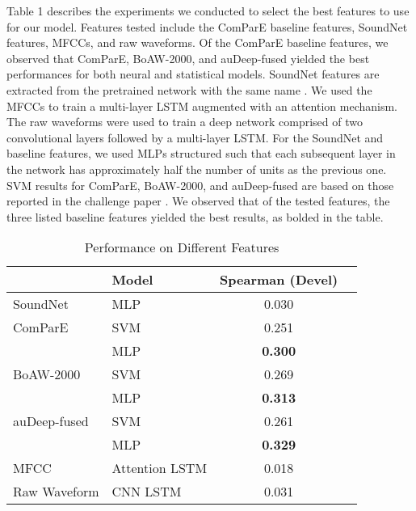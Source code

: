 Table 1 describes the experiments we conducted to select the best features to use for our model.
Features tested include the ComParE baseline features, SoundNet features, MFCCs, and raw waveforms. Of the ComParE baseline features, we observed that ComParE, BoAW-2000, and auDeep-fused yielded the best performances for both neural and statistical models. SoundNet features are extracted from the pretrained network with the same name \cite{aytar2016soundnet}. We used the MFCCs to train a multi-layer LSTM augmented with an attention mechanism. The raw waveforms were used to train a deep network comprised of two convolutional layers followed by a multi-layer LSTM.
For the SoundNet and baseline features, we used MLPs structured such that each subsequent layer in the network has approximately half the number of units as the previous one.
SVM results for ComParE, BoAW-2000, and auDeep-fused are based on those reported in the challenge paper \cite{schuller2019interspeech}.
We observed that of the tested features, the three listed baseline features yielded the best results, as bolded in the table.

\begin{table}[h]
\centering
\caption{Performance on Different Features}
\label{spk_id}
\begin{tabular}{llcc}
                            & Model    & {Spearman (Devel)} \\ \toprule
SoundNet                & MLP &  0.030           \\ \toprule
ComParE                     & SVM &  0.251           \\
                            & MLP     &  \textbf{0.300}           \\ \toprule
BoAW-2000                   & SVM &  0.269           \\
                            & MLP     &  \textbf{0.313}           \\ \toprule
auDeep-fused                & SVM &  0.261           \\
                            & MLP     &  \textbf{0.329}           \\ \toprule
MFCC                & Attention LSTM &  0.018           \\ \toprule
Raw Waveform                & CNN LSTM &  0.031           \\ \bottomrule                            
\end{tabular}
\end{table}

